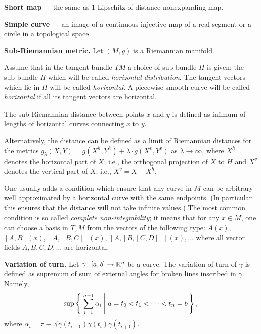 \begin{description}
\item{\bf Short map}\label{Short map} --- the same as 1-Lipschitz of distance nonexpanding map.

\item{\bf Simple curve}\label{Simple curve} --- an image of a continuous injective map of a real segment or a circle in a topological space.

\item{\bf Sub-Riemannian metric.}\label{Sub-Riemannian metric}
Let $(M,g)$ is a Riemannian manifold.

Assume that in the tangent bundle $TM$ 
a choice of sub-bundle $H$ is given;
the sub-bundle $H$ which will be called  \emph{horizontal distribution}.
The tangent vectors which lie in $H$ will be called \emph{horizontal}.
A piecewise smooth curve will be called \emph{horizontal}
if all its tangent vectors are horizontal.

The sub-Riemannian distance between points $x$ and $y$ is defined as infimum of lengths of horizontal curves connecting $x$ to $y$.

Alternatively, the distance can be defined as a limit of Riemannian distances 
for the metrics $g_\lambda(X,Y)=g(X^h,Y^h)+\lambda\cdot g(X^v,Y^v)$ 
as $\lambda\to \infty$,
where $X^h$ denotes the horizontal part of $X$;
i.e., the orthogonal projection of $X$ to $H$
and $X^v$ denotes the vertical part of $X$;
i.e., $X^v=X-X^h$.

One usually adds a condition which ensure that any curve in $M$ can be arbitrary well approximated by a horizontal curve with the same endpoints.
(In particular this ensures that the distance will not take infinite values.)
The most common condition is so called  \emph{complete non-integrability};
it means that for any $x\in M$, 
one can choose a basis in $T_xM$
from the vectors of the following type:
$A(x)$, $[A,B](x)$, $[A,[B,C]](x)$, $[A,[B,[C,D]]](x),\dots$ where all vector fields $A,B,C,D, \dots$ are horizontal.


\item{\bf Variation of turn.}\label{Variation of turn} Let $\gamma\colon[a,b]\to\mathbb{R}^n$ be a curve.
The variation of turn of $\gamma$ is defined as supremum of sum of external angles for broken lines inscribed in $\gamma$. 
Namely, 
$$\sup\set{\sum_{i=1}^{n-1}\alpha_i}{a=t_0<t_1<\dots<t_n=b},$$
where $\alpha_i=\pi-\measuredangle \gamma(t_{i-1})\gamma(t_{i})\gamma(t_{i+1})$.
\end{description}